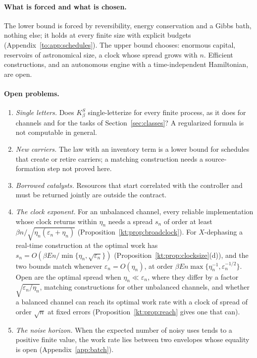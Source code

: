 \paragraph{What is forced and what is chosen.} The lower bound is forced by reversibility, energy conservation and a Gibbs bath, nothing else; it holds at every finite size with explicit budgets (Appendix~\ref{to:app:schedules}). The upper bound chooses: enormous capital, reservoirs of astronomical size, a clock whose spread grows with $n$. Efficient constructions, and an autonomous engine with a time-independent Hamiltonian, are open.

\paragraph{Open problems.}
\begin{enumerate}[leftmargin=*]
\item \emph{Single letters.} Does $K_\beta^S$ single-letterize for every finite process, as it does for channels and for the tasks of Section~\ref{sec:classes}? A regularized formula is not computable in general.
\item \emph{New carriers.} The law with an inventory term is a lower bound for schedules that create or retire carriers; a matching construction needs a source-formation step not proved here.
\item \emph{Borrowed catalysts.} Resources that start correlated with the controller and must be returned jointly are outside the contract.
\item \emph{The clock exponent.} For an unbalanced channel, every reliable implementation whose clock returns within $\eta_n$ needs a spread $s_n$ of order at least $\beta n/\sqrt{\eta_n(\varepsilon_n+\eta_n)}$ (Proposition~\ref{kt:prop:broadclock}). For $X$-dephasing a real-time construction at the optimal work has $s_n=O(\beta En/\min\{\eta_n,\sqrt{\varepsilon_n}\})$ (Proposition~\ref{kt:prop:clocksize}(d)), and the two bounds match whenever $\varepsilon_n=O(\eta_n)$, at order $\beta En\max\{\eta_n^{-1},\varepsilon_n^{-1/2}\}$. Open are the optimal spread when $\eta_n\ll\varepsilon_n$, where they differ by a factor $\sqrt{\varepsilon_n/\eta_n}$, matching constructions for other unbalanced channels, and whether a balanced channel can reach its optimal work rate with a clock of spread of order $\sqrt n$ at fixed errors (Proposition~\ref{kt:prop:reach} gives one that can).
\item \emph{The noise horizon.} When the expected number of noisy uses tends to a positive finite value, the work rate lies between two envelopes whose equality is open (Appendix~\ref{app:batch}).

\end{enumerate}
